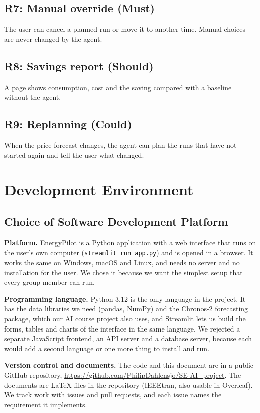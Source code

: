 \documentclass[conference,a4paper]{IEEEtran}
\begin{document}
\subsection{R7: Manual override (Must)}
The user can cancel a planned run or move it to another time. Manual choices are never changed by the agent.

\subsection{R8: Savings report (Should)}
A page shows consumption, cost and the saving compared with a baseline without the agent.

\subsection{R9: Replanning (Could)}
When the price forecast changes, the agent can plan the runs that have not started again and tell the user what changed.

\section{Development Environment}

\subsection{Choice of Software Development Platform}
\textbf{Platform.} EnergyPilot is a Python application with a web interface that runs on the user's own computer (\texttt{streamlit run app.py}) and is opened in a browser. It works the same on Windows, macOS and Linux, and needs no server and no installation for the user. We chose it because we want the simplest setup that every group member can run.

\textbf{Programming language.} Python 3.12 is the only language in the project. It has the data libraries we need (pandas, NumPy) and the Chronos-2 forecasting package, which our AI course project also uses, and Streamlit lets us build the forms, tables and charts of the interface in the same language. We rejected a separate JavaScript frontend, an API server and a database server, because each would add a second language or one more thing to install and run.

\textbf{Version control and documents.} The code and this document are in a public GitHub repository, \url{https://github.com/PhilipDahlensjo/SE-AI_project}. The documents are LaTeX files in the repository (IEEEtran, also usable in Overleaf). We track work with issues and pull requests, and each issue names the requirement it implements.
\end{document}
